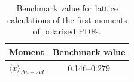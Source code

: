 \begin{table}
\renewcommand{\arraystretch}{1.2} 
\centering
\begin{tabular}{cc}
\hline 
\rule[-4 ex]{0pt}{7 ex}  %
Moment & Benchmark value \vspace*{-10pt}\\
\hline 
$\langle x \rangle_{\Delta u - \Delta d}$ & \numrange{0.146}{0.279}  \\
\hline 
\end{tabular}
\caption{Benchmark value for lattice calculations of the first moments of polarised PDFs.}
\label{tab:LQCDpol1}
\end{table}

